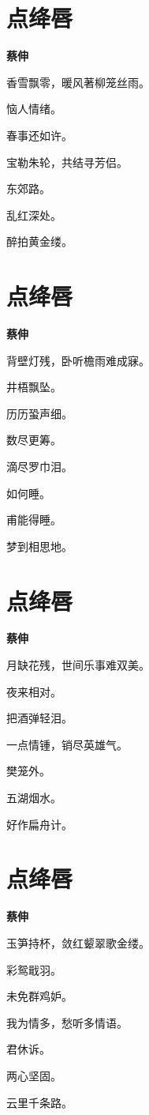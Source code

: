 \documentclass[12pt,a4paper]{ctexbook}
\begin{document}
\section{点绛唇}
\textbf{蔡伸}\par\vspace{0.5em}
香雪飘零，暖风著柳笼丝雨。\par
恼人情绪。\par
春事还如许。\par
宝勒朱轮，共结寻芳侣。\par
东郊路。\par
乱红深处。\par
醉拍黄金缕。\par

\section{点绛唇}
\textbf{蔡伸}\par\vspace{0.5em}
背壁灯残，卧听檐雨难成寐。\par
井梧飘坠。\par
历历蛩声细。\par
数尽更筹。\par
滴尽罗巾泪。\par
如何睡。\par
甫能得睡。\par
梦到相思地。\par

\section{点绛唇}
\textbf{蔡伸}\par\vspace{0.5em}
月缺花残，世间乐事难双美。\par
夜来相对。\par
把酒弹轻泪。\par
一点情锺，销尽英雄气。\par
樊笼外。\par
五湖烟水。\par
好作扁舟计。\par

\section{点绛唇}
\textbf{蔡伸}\par\vspace{0.5em}
玉笋持杯，敛红颦翠歌金缕。\par
彩鸳戢羽。\par
未免群鸡妒。\par
我为情多，愁听多情语。\par
君休诉。\par
两心坚固。\par
云里千条路。\par
\end{document}
